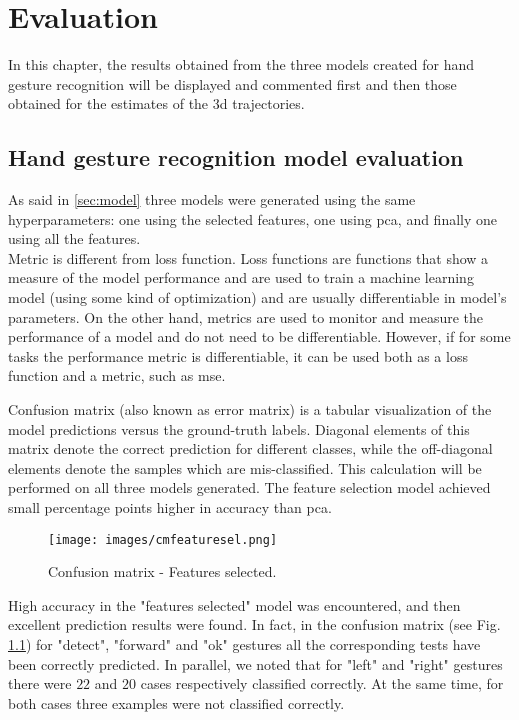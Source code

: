 \chapter{Evaluation}
\label{chap:evaluation}
In this chapter, the results obtained from the three models created for hand gesture recognition will be displayed and commented first and then those obtained for the estimates of the 3d trajectories.

\section{Hand gesture recognition model evaluation}
\label{sec:handeval}
As said in \ref{sec:model} three models were generated using the same hyperparameters: one using the selected features, one using \gls{pca}, and finally one using all the features. \\ 

\noindent Metric is different from loss function. Loss functions are functions that show a measure of the model performance and are used to train a machine learning model (using some kind of optimization) and are usually differentiable in model’s parameters. On the other hand, metrics are used to monitor and measure the performance of a model and do not need to be differentiable. However, if for some tasks the performance metric is differentiable, it can be used both as a loss function and a metric, such as \gls{mse}.

\noindent Confusion matrix (also known as error matrix) is a tabular visualization of the model predictions versus the ground-truth labels. Diagonal elements of this matrix denote the correct prediction for different classes, while the off-diagonal elements denote the samples which are mis-classified. This calculation will be performed on all three models generated. The feature selection model achieved small percentage points higher in accuracy than \gls{pca}.

\begin{figure}[H]
	\centering
	\texttt{[image: images/cmfeaturesel.png]}
	\caption[Confusion matrix - Features selected.]{Confusion matrix - Features selected.}
	\label{fig:confselec}
\end{figure}

\noindent High accuracy in the "features selected" model was encountered, and then excellent prediction results were found. In fact, in the confusion matrix (see Fig. \ref{fig:confselec}) for "detect", "forward" and "ok" gestures all the corresponding tests have been correctly predicted. In parallel, we noted that for "left" and "right" gestures there were $22$ and $20$ cases respectively classified correctly. At the same time, for both cases three examples were not classified correctly. \\


